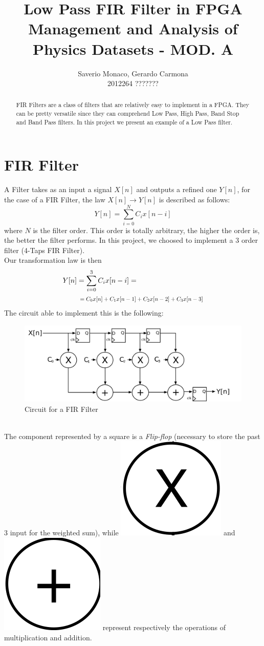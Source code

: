 \documentclass[11pt,a4paper,twocolumn]{IEEEtran}
\author{Saverio Monaco, Gerardo Carmona\\ 2012264\hspace{1.5cm} ???????\\ \sepline}
\title{\textbf{Low Pass FIR Filter in FPGA}\\ Management and Analysis of Physics Datasets - MOD. A}
\newcommand*{\Scale}[2][4]{\scalebox{#1}{$#2$}}
\begin{document}
	\maketitle
	\begin{abstract}
		FIR Filters are a class of filters that are relatively easy to implement in a FPGA. They can be pretty versatile since they can comprehend Low Pass, High Pass, Band Stop and Band Pass filters. In this project we present an example of a Low Pass filter.
	\end{abstract}
	\section{FIR Filter}
	A Filter takes as an input a signal $X[n]$ and outputs a refined one $Y[n]$, for the case of a FIR Filter, the law $X[n]\to Y[n]$ is described as follows: 
	$$ Y[n] = \sum_{i=0}^N C_i x[n-i] $$
	where $N$ is the filter order. This order is totally arbitrary, the higher the order is, the better the filter performs. In this project, we choosed to implement a 3 order filter (4-Taps FIR Filter).\\ Our transformation law is then
	$$\begin{aligned} Y[n]&=\sum_{i=0}^3 C_ix[n-i]=\\ & \Scale[0.8]{\hspace*{.2cm}=C_0x[n]+C_1x[n-1]+C_2x[n-2]+C_3x[n-3]}\end{aligned}$$
	The circuit able to implement this is the following:
	\begin{figure}[h]
		\centering
		\includegraphics[width=1\linewidth]{img/FIR_direct_svg}
		\caption{Circuit for a FIR Filter}
	\end{figure}\\
	The component represented by a square is a \emph{Flip-flop} (necessary to store the past 3 input for the weighted sum), while \includegraphics[width=0.05\linewidth]{img/x} and \includegraphics[width=0.05\linewidth]{img/+} represent respectively the operations of multiplication and addition.
\end{document}
